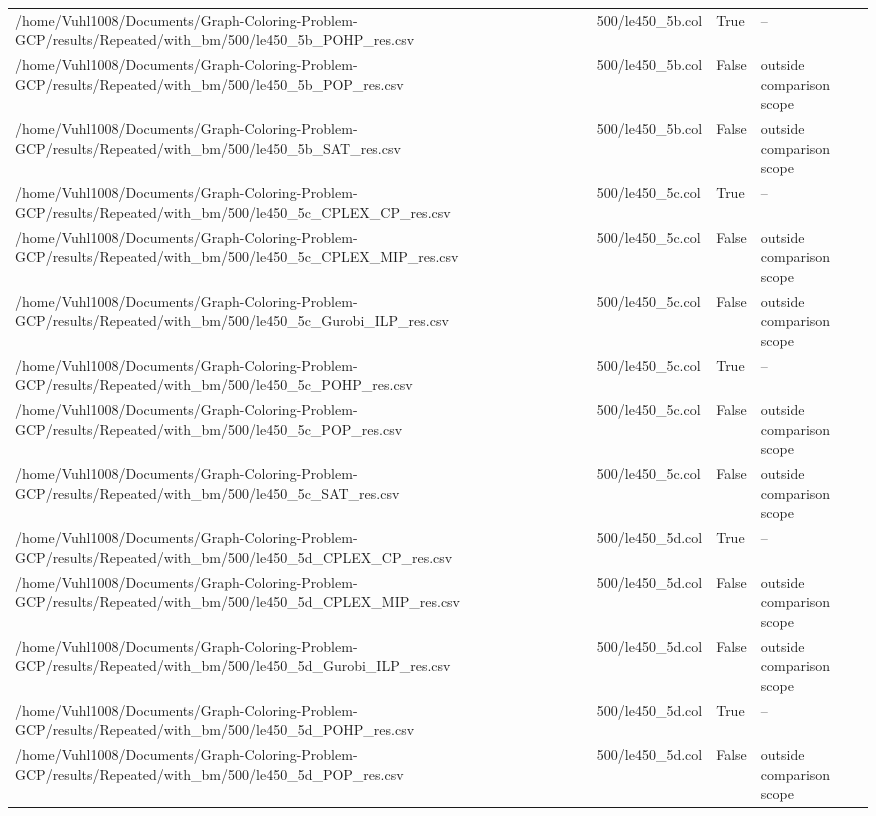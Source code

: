 \begin{table}[htbp]
\begin{tabular}{llll}
/home/Vuhl1008/Documents/Graph-Coloring-Problem-GCP/results/Repeated/with\_bm/500/le450\_5b\_POHP\_res.csv & 500/le450\_5b.col & True & -- \\
/home/Vuhl1008/Documents/Graph-Coloring-Problem-GCP/results/Repeated/with\_bm/500/le450\_5b\_POP\_res.csv & 500/le450\_5b.col & False & outside comparison scope \\
/home/Vuhl1008/Documents/Graph-Coloring-Problem-GCP/results/Repeated/with\_bm/500/le450\_5b\_SAT\_res.csv & 500/le450\_5b.col & False & outside comparison scope \\
/home/Vuhl1008/Documents/Graph-Coloring-Problem-GCP/results/Repeated/with\_bm/500/le450\_5c\_CPLEX\_CP\_res.csv & 500/le450\_5c.col & True & -- \\
/home/Vuhl1008/Documents/Graph-Coloring-Problem-GCP/results/Repeated/with\_bm/500/le450\_5c\_CPLEX\_MIP\_res.csv & 500/le450\_5c.col & False & outside comparison scope \\
/home/Vuhl1008/Documents/Graph-Coloring-Problem-GCP/results/Repeated/with\_bm/500/le450\_5c\_Gurobi\_ILP\_res.csv & 500/le450\_5c.col & False & outside comparison scope \\
/home/Vuhl1008/Documents/Graph-Coloring-Problem-GCP/results/Repeated/with\_bm/500/le450\_5c\_POHP\_res.csv & 500/le450\_5c.col & True & -- \\
/home/Vuhl1008/Documents/Graph-Coloring-Problem-GCP/results/Repeated/with\_bm/500/le450\_5c\_POP\_res.csv & 500/le450\_5c.col & False & outside comparison scope \\
/home/Vuhl1008/Documents/Graph-Coloring-Problem-GCP/results/Repeated/with\_bm/500/le450\_5c\_SAT\_res.csv & 500/le450\_5c.col & False & outside comparison scope \\
/home/Vuhl1008/Documents/Graph-Coloring-Problem-GCP/results/Repeated/with\_bm/500/le450\_5d\_CPLEX\_CP\_res.csv & 500/le450\_5d.col & True & -- \\
/home/Vuhl1008/Documents/Graph-Coloring-Problem-GCP/results/Repeated/with\_bm/500/le450\_5d\_CPLEX\_MIP\_res.csv & 500/le450\_5d.col & False & outside comparison scope \\
/home/Vuhl1008/Documents/Graph-Coloring-Problem-GCP/results/Repeated/with\_bm/500/le450\_5d\_Gurobi\_ILP\_res.csv & 500/le450\_5d.col & False & outside comparison scope \\
/home/Vuhl1008/Documents/Graph-Coloring-Problem-GCP/results/Repeated/with\_bm/500/le450\_5d\_POHP\_res.csv & 500/le450\_5d.col & True & -- \\
/home/Vuhl1008/Documents/Graph-Coloring-Problem-GCP/results/Repeated/with\_bm/500/le450\_5d\_POP\_res.csv & 500/le450\_5d.col & False & outside comparison scope \\

\end{tabular}
\end{table}
